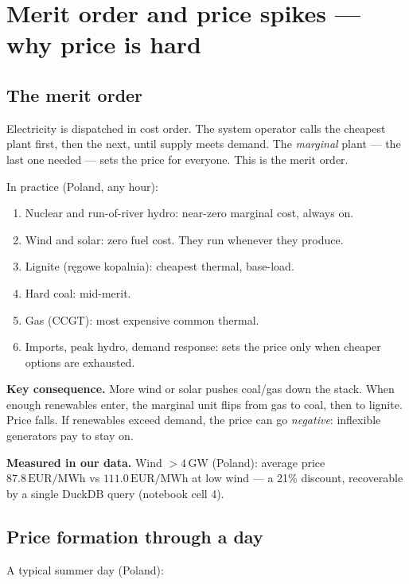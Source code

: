 \section{Merit order and price spikes --- why price is hard}

\subsection{The merit order}

Electricity is dispatched in cost order. The system operator calls the
cheapest plant first, then the next, until supply meets demand. The
\emph{marginal} plant --- the last one needed --- sets the price for
everyone. This is the merit order.

In practice (Poland, any hour):

\begin{enumerate}
  \item Nuclear and run-of-river hydro: near-zero marginal cost, always on.
  \item Wind and solar: zero fuel cost. They run whenever they produce.
  \item Lignite (r\k{e}gowe kopalnia): cheapest thermal, base-load.
  \item Hard coal: mid-merit.
  \item Gas (CCGT): most expensive common thermal.
  \item Imports, peak hydro, demand response: sets the price only when
        cheaper options are exhausted.
\end{enumerate}

\textbf{Key consequence.} More wind or solar pushes coal/gas down the stack.
When enough renewables enter, the marginal unit flips from gas to coal,
then to lignite. Price falls. If renewables exceed demand, the price can
go \emph{negative}: inflexible generators pay to stay on.

\textbf{Measured in our data.} Wind $>4\,\mathrm{GW}$ (Poland): average price
$87.8\,\mathrm{EUR/MWh}$ vs $111.0\,\mathrm{EUR/MWh}$ at low wind --- a 21\%
discount, recoverable by a single DuckDB query (notebook cell 4).

\subsection{Price formation through a day}

A typical summer day (Poland):

